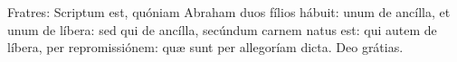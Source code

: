 Fratres: Scriptum est, quóniam Abraham duos fílios hábuit: unum de ancílla, et unum de líbera: sed qui de ancílla, secúndum carnem natus est: qui autem de líbera, per repromissiónem: quæ sunt per allegoríam dicta. \rubric{\Rbar} Deo grátias.
